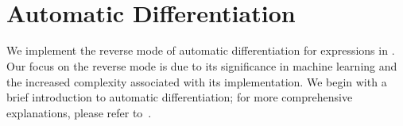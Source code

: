 \begin{code}[hide]%
\>[0]\AgdaSpace{}%
\AgdaSpace{}%
\<%
\\
\>[0]\AgdaSpace{}%
\AgdaSpace{}%
\<%
\\
\>[0]\AgdaSpace{}%
\AgdaSpace{}%
\AgdaSpace{}%
\AgdaSpace{}%
\AgdaSymbol{(}\AgdaSymbol{;}\AgdaSpace{}%
\AgdaInductiveConstructor{[]}\AgdaSymbol{;}\AgdaSpace{}%
\AgdaSymbol{)}\<%
\\
\>[0]\AgdaSpace{}%
\AgdaSpace{}%
\<%
\\
\>[0]\AgdaSpace{}%
\AgdaSpace{}%
\<%
\\
%
\\[\AgdaEmptyExtraSkip]%
\>[0]\<%
\\
\>[0]\AgdaSpace{}%
\AgdaSpace{}%
\<%
\\
\>[0]\AgdaSpace{}%
\AgdaSpace{}%
\<%
\\
\>[0]\AgdaSpace{}%
\AgdaModule{\AgdaUnderscore{}}\AgdaSpace{}%
\<%
\end{code}

\section{Automatic Differentiation\label{sec:ad}}


We implement the reverse mode of automatic differentiation for expressions in
. Our focus on the reverse mode is due to its significance in machine
learning and the increased complexity associated with its implementation. We
begin with a brief introduction to automatic differentiation; for more
comprehensive explanations, please refer to~\cite{autodiff-survey,
backprop-stlc}.

